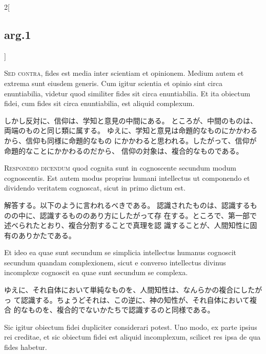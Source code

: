 \documentclass[paper=a4paper,fontsize=10pt,jafontsize=9pt,titlepage]{jlreq}
\begin{document}
\begin{paracol}{2}[\subsection{arg.1}]
\switchcolumn*[\subsection{s.c.}]

{\scshape Sed contra}, fides est media inter
scientiam et opinionem. Medium autem et extrema sunt eiusdem
generis. Cum igitur scientia et opinio sint circa enuntiabilia, videtur
quod similiter fides sit circa enuntiabilia. Et ita obiectum fidei, cum
fides sit circa enuntiabilia, est aliquid complexum.

\switchcolumn

しかし反対に、信仰は、学知と意見の中間にある。
ところが、中間のものは、両端のものと同じ類に属する。
ゆえに、学知と意見は命題的なものにかかわるから、信仰も同様に命題的なもの
 にかかわると思われる。したがって、信仰が命題的なことにかかわるのだから、
 信仰の対象は、複合的なものである。


{\scshape Respondeo dicendum} quod cognita sunt in
cognoscente secundum modum cognoscentis. Est autem modus proprius humani
intellectus ut componendo et dividendo veritatem cognoscat, sicut in
primo dictum est.

\switchcolumn

解答する。以下のように言われるべきである。
認識されたものは、認識するものの中に、認識するもののあり方にしたがって存
 在する。ところで、第一部で述べられたとおり、複合分割することで真理を認
 識することが、人間知性に固有のありかたである。

\switchcolumn*

Et ideo ea quae sunt secundum se simplicia intellectus
humanus cognoscit secundum quandam complexionem, sicut e converso
intellectus divinus incomplexe cognoscit ea quae sunt secundum se
complexa.

\switchcolumn

ゆえに、それ自体において単純なものを、人間知性は、なんらかの複合にしたがっ
 て認識する。ちょうどそれは、この逆に、神の知性が、それ自体において複合
 的なものを、複合的でないかたちで認識するのと同様である。

\switchcolumn*

Sic igitur obiectum fidei dupliciter considerari potest. Uno
modo, ex parte ipsius rei creditae, et sic obiectum fidei est aliquid
incomplexum, scilicet res ipsa de qua fides habetur.


\end{paracol}
\end{document}
